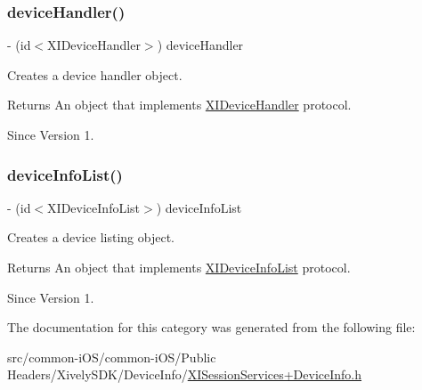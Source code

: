 \subsubsection{\texorpdfstring{device\+Handler()}{deviceHandler()}}
{\footnotesize\ttfamily -\/ (id$<$X\+I\+Device\+Handler$>$) device\+Handler \begin{DoxyParamCaption}{ }\end{DoxyParamCaption}}



Creates a device handler object. 

\begin{DoxyReturn}{Returns}
An object that implements \hyperlink{}{X\+I\+Device\+Handler} protocol. 
\end{DoxyReturn}
\begin{DoxySince}{Since}
Version 1. 
\end{DoxySince}
\hypertarget{category_x_i_session_services_07_device_info_08_a7a24cbd0be8420fe8f6360a7e2324810}{}\label{category_x_i_session_services_07_device_info_08_a7a24cbd0be8420fe8f6360a7e2324810} 
\subsubsection{\texorpdfstring{device\+Info\+List()}{deviceInfoList()}}
{\footnotesize\ttfamily -\/ (id$<$X\+I\+Device\+Info\+List$>$) device\+Info\+List \begin{DoxyParamCaption}{ }\end{DoxyParamCaption}}



Creates a device listing object. 

\begin{DoxyReturn}{Returns}
An object that implements \hyperlink{}{X\+I\+Device\+Info\+List} protocol. 
\end{DoxyReturn}
\begin{DoxySince}{Since}
Version 1. 
\end{DoxySince}


The documentation for this category was generated from the following file\+:\begin{DoxyCompactItemize}
\item 
src/common-\/i\+O\+S/common-\/i\+O\+S/\+Public Headers/\+Xively\+S\+D\+K/\+Device\+Info/\hyperlink{_x_i_session_services_09_device_info_8h}{X\+I\+Session\+Services+\+Device\+Info.\+h}\end{DoxyCompactItemize}
